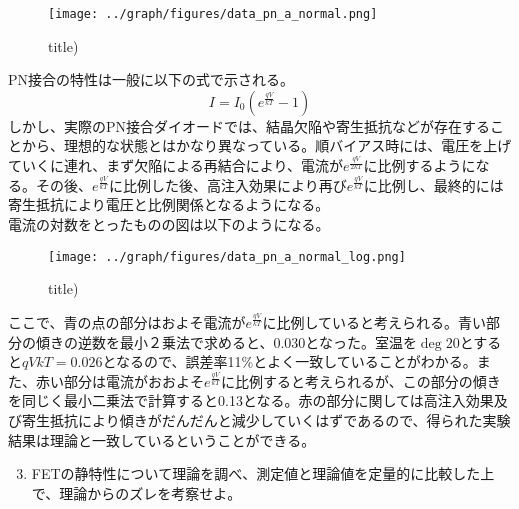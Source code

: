 \documentclass[a4j,dvipdfmx]{article}
\begin{document}
\begin{figure}
\begin{center}
\texttt{[image: ../graph/figures/data\_pn\_a\_normal.png]}
\caption{title)}
\end{center}
\end{figure}

PN接合の特性は一般に以下の式で示される。
$$
I = I_0\left(e^{\frac{qV}{kT}}-1\right)
$$
しかし、実際のPN接合ダイオードでは、結晶欠陥や寄生抵抗などが存在することから、理想的な状態とはかなり異なっている。順バイアス時には、電圧を上げていくに連れ、まず欠陥による再結合により、電流が$e^{\frac{qV}{2kT}}$に比例するようになる。その後、$e^{\frac{qV}{kT}}$に比例した後、高注入効果により再び$e^{\frac{qV}{kT}}$に比例し、最終的には寄生抵抗により電圧と比例関係となるようになる。\\

電流の対数をとったものの図は以下のようになる。
\begin{figure}
  \begin{center}
  \texttt{[image: ../graph/figures/data\_pn\_a\_normal\_log.png]}
  \caption{title)}
  \end{center}
\end{figure}
ここで、青の点の部分はおよそ電流が$e^{\frac{qV}{kT}}$に比例していると考えられる。青い部分の傾きの逆数を最小２乗法で求めると、0.030となった。室温を$\deg{20}$とすると${qV}{kT}=0.026$となるので、誤差率11\%とよく一致していることがわかる。また、赤い部分は電流がおおよそ$e^{\frac{qV}{kT}}$に比例すると考えられるが、この部分の傾きを同じく最小二乗法で計算すると0.13となる。赤の部分に関しては高注入効果及び寄生抵抗により傾きがだんだんと減少していくはずであるので、得られた実験結果は理論と一致しているということができる。

\begin{enumerate}[label={(\arabic*)}]
  \setcounter{enumi}{2}
  \item FETの静特性について理論を調べ、測定値と理論値を定量的に比較した上で、理論からのズレを考察せよ。
\end{enumerate}
\end{document}
